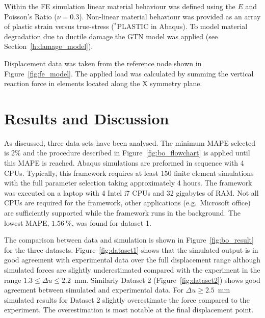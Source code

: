 \documentclass[preprint, review, 12pt]{elsarticle}
\begin{document}
	Within the FE simulation linear material behaviour was defined using the $E$ and Poisson's Ratio ($\nu=0.3$).
	Non-linear material behaviour was provided as an array of plastic strain versus true-stress ($^*$PLASTIC in Abaqus).
	To model material degradation due to ductile damage the GTN model was applied (see Section~\ref{h:damage_model}).

	Displacement data was taken from the reference node shown in Figure~\ref{fig:fe_model}.
	The applied load was calculated by summing the vertical reaction force in elements located along the X symmetry plane.

	\section{Results and Discussion}
	\label{h:results}
 	As discussed, three data sets have been analysed.
	The minimum MAPE selected is 2\% and the procedure described in Figure~\ref{fig:bo_flowchart} is applied until this MAPE is reached.
	Abaqus simulations are preformed in sequence with 4 CPUs.
	Typically, this framework requires at least 150 finite element simulations with the full parameter selection taking approximately 4 hours.
	The framework was executed on a laptop with 4 Intel i7 CPUs and 32 gigabytes of RAM.
	Not all CPUs are required for the framework, other applications (e.g.\ Microsoft office) are sufficiently supported while the framework runs in the background.
	The lowest MAPE, $1.56~$\%, was found for dataset 1.

	The comparison between data and simulation is shown in Figure~\ref{fig:bo_result} for the three datasets.
 	Figure~\ref{fig:dataset1} shows that the simulated output is in good agreement with experimental data over the full displacement range although simulated forces are slightly underestimated compared with the experiment in the range $1.3 \leq \Delta u \leq 2.2$~mm.
	Similarly Dataset 2 (Figure~\ref{fig:dataset2}) shows good agreement between simulated and experimental data.
	For $\Delta u \geq 2.5$~mm simulated results for Dataset 2 slightly overestimate the force compared to the experiment.
	The overestimation is most notable at the final displacement point.
\end{document}
